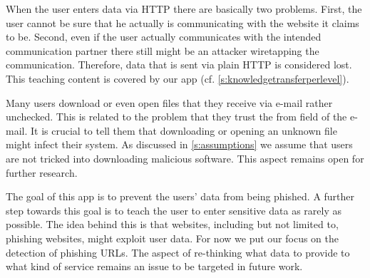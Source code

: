 \begin{description}[leftmargin=0cm]
	\item[Data Entry Via HTTPS:] 	When the user enters data via HTTP there are basically two problems.
	First, the user cannot be sure that he actually is communicating with the website it claims to be.
Second, even if the user actually communicates with the intended communication partner there still might be an attacker wiretapping the communication.
Therefore, data that is sent via plain HTTP is considered lost. 
	This teaching content is covered by our app (cf. \autoref{s:knowledgetransferperlevel}).	
	\item[Do Not Download Attachments:] Many users download or even open files that they receive via e-mail rather unchecked.
	This is related to the problem that they trust the from field of the e-mail.
	It is crucial to tell them that downloading or opening an unknown file might infect their system.
	As discussed in \autoref{s:assumptions} we assume that users are not tricked into downloading malicious software.
This aspect remains open for further research.
	\item[Data Economy:] The goal of this app is to prevent the users' data from being phished.
	A further step towards this goal is to teach the user to enter sensitive data as rarely as possible.
	The idea behind this is that websites, including but not limited to, phishing websites, might exploit user data. 
	For now we put our focus on the detection of phishing URLs.
The aspect of re-thinking what data to provide to what kind of service remains an issue to be targeted in future work.
\end{description}

